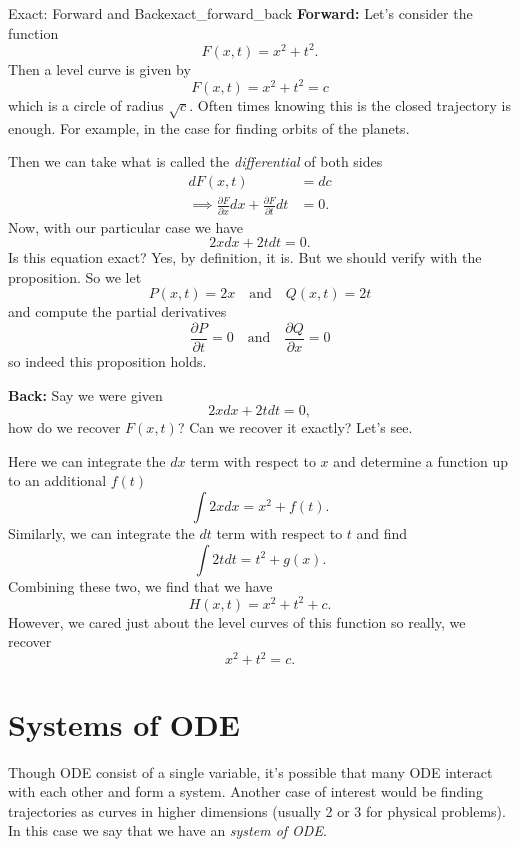         \begin{ex}{Exact: Forward and Back}{exact_forward_back}
        \noindent \textbf{Forward:}
        Let's consider the function
        \[
        F(x,t) = x^2+t^2.
        \]
        Then a level curve is given by
        \[
        F(x,t)=x^2+t^2 = c
        \]
        which is a circle of radius $\sqrt{c}$.  Often times knowing this is the closed trajectory is enough.  For example, in the case for finding orbits of the planets.
        
        Then we can take what is called the \emph{differential} of both sides
        \begin{align*}
        dF(x,t)&=dc\\
        \implies \frac{\partial F}{\partial x}dx + \frac{\partial F}{\partial t}dt &= 0.
        \end{align*}
        Now, with our particular case we have
        \[
        2xdx+2tdt = 0.
        \]
        Is this equation exact? Yes, by definition, it is.  But we should verify with the proposition.  So we let
        \[
        P(x,t) = 2x \quad \textrm{and} \quad Q(x,t) = 2t
        \]
        and compute the partial derivatives
        \[
        \frac{\partial P}{\partial t} = 0 \quad \textrm{and} \quad \frac{\partial Q}{\partial x} = 0
        \]
        so indeed this proposition holds.
        
        \noindent \textbf{Back:} Say we were given
        \[
        2xdx+2tdt = 0, 
        \]
        how do we recover $F(x,t)$?  Can we recover it exactly?  Let's see.
        
        Here we can integrate the $dx$ term with respect to $x$ and determine a function up to an additional $f(t)$
        \[
        \int 2xdx = x^2 + f(t).
        \]
        Similarly, we can integrate the $dt$ term with respect to $t$ and find
        \[
        \int 2tdt = t^2 + g(x).
        \]
        Combining these two, we find that we have
        \[
        H(x,t) = x^2+t^2+c.
        \]
        However, we cared just about the level curves of this function so really, we recover
        \[
        x^2+t^2=c.
        \]
        \end{ex}
    
        \chapter{Systems of ODE}
        Though ODE consist of a single variable, it's possible that many ODE interact with each other and form a system.  Another case of interest would be finding trajectories as curves in higher dimensions (usually 2 or 3 for physical problems).  In this case we say that we have an \emph{system of ODE}.  
        
